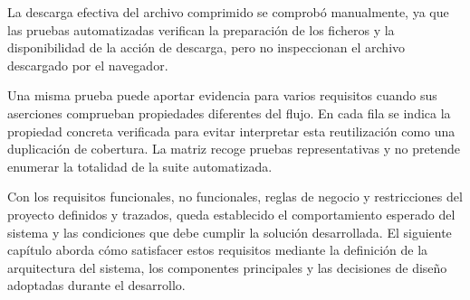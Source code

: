 La descarga efectiva del archivo comprimido se comprobó manualmente, ya que
las pruebas automatizadas verifican la preparación de los ficheros y la
disponibilidad de la acción de descarga, pero no inspeccionan el archivo
descargado por el navegador.

Una misma prueba puede aportar evidencia para varios requisitos cuando sus
aserciones comprueban propiedades diferentes del flujo. En cada fila se indica
la propiedad concreta verificada para evitar interpretar esta reutilización
como una duplicación de cobertura. La matriz recoge pruebas representativas y
no pretende enumerar la totalidad de la suite automatizada.


Con los requisitos funcionales, no funcionales, reglas de negocio y restricciones del proyecto definidos y trazados, queda establecido el comportamiento esperado del sistema y las condiciones que debe cumplir la solución desarrollada. El siguiente capítulo aborda cómo satisfacer estos requisitos mediante la definición de la arquitectura del sistema, los componentes principales y las decisiones de diseño adoptadas durante el desarrollo.
